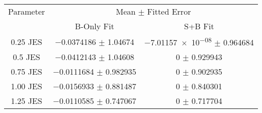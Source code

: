 \begin{scriptsize}
\begin{table}
\centering
\begin{tabular}{ccc}
\toprule
Parameter & \multicolumn{2}{c}{{Mean $\pm$ Fitted Error}}\\
 & {B-Only Fit} & {S+B Fit}\\
\midrule
\num{0.25} JES & \num{-0.0374186} $\pm$ \num{1.04674} & \num{-7.01157e-08} $\pm$ \num{0.964684}\\
\num{0.5} JES & \num{-0.0412143} $\pm$ \num{1.04608} & \num{0} $\pm$ \num{0.929943}\\
\num{0.75} JES & \num{-0.0111684} $\pm$ \num{0.982935} & \num{0} $\pm$ \num{0.902935}\\
\num{1.00} JES & \num{-0.0156933} $\pm$ \num{0.881487} & \num{0} $\pm$ \num{0.840301}\\
\num{1.25} JES & \num{-0.0110585} $\pm$ \num{0.747067} & \num{0} $\pm$ \num{0.717704}\\
\bottomrule
\end{tabular}
\end{table}
\end{scriptsize}

